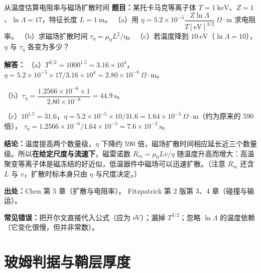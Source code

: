 \begin{example}{从温度估算电阻率与磁场扩散时间}{}
\textbf{题目：}某托卡马克等离子体 $T=1\ \mathrm{keV}$、$Z=1$、$\ln\Lambda=17$，特征长度 $L=1\ \mathrm{m}$。
（a）用 $\eta=5.2\times10^{-5}\dfrac{Z\ln\Lambda}{T[\mathrm{eV}]^{3/2}}\ \Omega\cdot\mathrm{m}$ 求电阻率。
（b）求磁场扩散时间 $\tau_\eta=\mu_0L^2/\eta$。
（c）若温度降到 $10\ \mathrm{eV}$（$\ln\Lambda=10$），$\eta$ 与 $\tau_\eta$ 各变为多少？

\textbf{解答：}
（a）$T^{3/2}=1000^{1.5}=3.16\times10^{4}$，
$\eta=5.2\times10^{-5}\times17/3.16\times10^{4}=2.80\times10^{-8}\ \Omega\cdot\mathrm{m}$。

（b）$\tau_\eta=\dfrac{1.2566\times10^{-6}\times1}{2.80\times10^{-8}}=44.9\ \mathrm{s}$。

（c）$10^{1.5}=31.6$，$\eta=5.2\times10^{-5}\times10/31.6=1.64\times10^{-5}\ \Omega\cdot\mathrm{m}$（约为原来的 $590$ 倍），
$\tau_\eta=1.2566\times10^{-6}/1.64\times10^{-5}=7.6\times10^{-2}\ \mathrm{s}$。

\textbf{结论：}温度提高两个数量级，$\eta$ 下降约 $590$ 倍，磁场扩散时间相应延长近三个数量级。所以\textbf{在给定尺度与流速下}，磁雷诺数 $R_m=\mu_0Lv/\eta$ 随温度升高而增大：高温聚变等离子体是磁冻结的好近似，低温器件中磁场可以迅速扩散。（注意 $R_m$ 还含 $L$ 与 $v$，扩散时标本身只由 $\eta$ 与尺度决定。）

{\footnotesize
\textbf{出处：}Chen 第 5 章（扩散与电阻率）。
Fitzpatrick 第 2 版第 3、4 章（碰撞与输运）。
}

\textbf{常见错误：}把开尔文直接代入公式（应为 eV）；漏掉 $T^{3/2}$；忽略 $\ln\Lambda$ 的温度依赖（它变化很慢，但并非常数）。
\end{example}


\section{玻姆判据与鞘层厚度}

